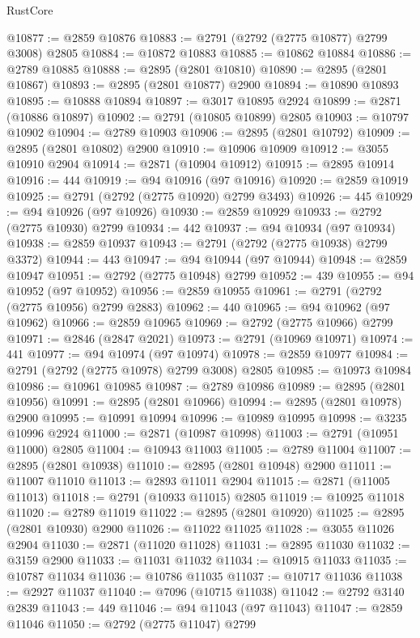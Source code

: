 \begin{lexlean}{RustCore}
\begin{coremodule}
@10877 := @2859 @10876
@10883 := @2791 (@2792 (@2775 @10877) @2799 @3008) @2805
@10884 := @10872 @10883
@10885 := @10862 @10884
@10886 := @2789 @10885
@10888 := @2895 (@2801 @10810)
@10890 := @2895 (@2801 @10867)
@10893 := @2895 (@2801 @10877) @2900
@10894 := @10890 @10893
@10895 := @10888 @10894
@10897 := @3017 @10895 @2924
@10899 := @2871 (@10886 @10897)
@10902 := @2791 (@10805 @10899) @2805
@10903 := @10797 @10902
@10904 := @2789 @10903
@10906 := @2895 (@2801 @10792)
@10909 := @2895 (@2801 @10802) @2900
@10910 := @10906 @10909
@10912 := @3055 @10910 @2904
@10914 := @2871 (@10904 @10912)
@10915 := @2895 @10914
@10916 := 444
@10919 := @94 @10916 (@97 @10916)
@10920 := @2859 @10919
@10925 := @2791 (@2792 (@2775 @10920) @2799 @3493)
@10926 := 445
@10929 := @94 @10926 (@97 @10926)
@10930 := @2859 @10929
@10933 := @2792 (@2775 @10930) @2799
@10934 := 442
@10937 := @94 @10934 (@97 @10934)
@10938 := @2859 @10937
@10943 := @2791 (@2792 (@2775 @10938) @2799 @3372)
@10944 := 443
@10947 := @94 @10944 (@97 @10944)
@10948 := @2859 @10947
@10951 := @2792 (@2775 @10948) @2799
@10952 := 439
@10955 := @94 @10952 (@97 @10952)
@10956 := @2859 @10955
@10961 := @2791 (@2792 (@2775 @10956) @2799 @2883)
@10962 := 440
@10965 := @94 @10962 (@97 @10962)
@10966 := @2859 @10965
@10969 := @2792 (@2775 @10966) @2799
@10971 := @2846 (@2847 @2021)
@10973 := @2791 (@10969 @10971)
@10974 := 441
@10977 := @94 @10974 (@97 @10974)
@10978 := @2859 @10977
@10984 := @2791 (@2792 (@2775 @10978) @2799 @3008) @2805
@10985 := @10973 @10984
@10986 := @10961 @10985
@10987 := @2789 @10986
@10989 := @2895 (@2801 @10956)
@10991 := @2895 (@2801 @10966)
@10994 := @2895 (@2801 @10978) @2900
@10995 := @10991 @10994
@10996 := @10989 @10995
@10998 := @3235 @10996 @2924
@11000 := @2871 (@10987 @10998)
@11003 := @2791 (@10951 @11000) @2805
@11004 := @10943 @11003
@11005 := @2789 @11004
@11007 := @2895 (@2801 @10938)
@11010 := @2895 (@2801 @10948) @2900
@11011 := @11007 @11010
@11013 := @2893 @11011 @2904
@11015 := @2871 (@11005 @11013)
@11018 := @2791 (@10933 @11015) @2805
@11019 := @10925 @11018
@11020 := @2789 @11019
@11022 := @2895 (@2801 @10920)
@11025 := @2895 (@2801 @10930) @2900
@11026 := @11022 @11025
@11028 := @3055 @11026 @2904
@11030 := @2871 (@11020 @11028)
@11031 := @2895 @11030
@11032 := @3159 @2900
@11033 := @11031 @11032
@11034 := @10915 @11033
@11035 := @10787 @11034
@11036 := @10786 @11035
@11037 := @10717 @11036
@11038 := @2927 @11037
@11040 := @7096 (@10715 @11038)
@11042 := @2792 @3140 @2839
@11043 := 449
@11046 := @94 @11043 (@97 @11043)
@11047 := @2859 @11046
@11050 := @2792 (@2775 @11047) @2799

\end{coremodule}
\end{lexlean}
